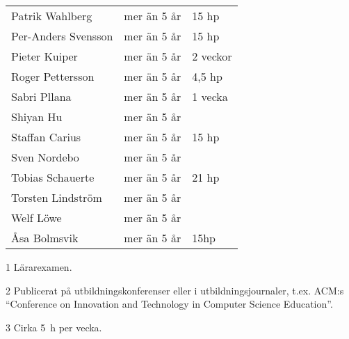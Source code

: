 \begin{threeparttable}
\begin{longtable}[]{@{}lll@{}}
Patrik Wahlberg              & mer än 5 år  & 15 hp         \tabularnewline     
Per-Anders Svensson          & mer än 5 år  & 15 hp         \tabularnewline     
Pieter Kuiper\tnote{2}       & mer än 5 år  & 2 veckor      \tabularnewline     
Roger Pettersson             & mer än 5 år  & 4,5 hp        \tabularnewline     
Sabri Pllana                 & mer än 5 år  & 1 vecka       \tabularnewline     
Shiyan Hu                    & mer än 5 år  &               \tabularnewline     
Staffan Carius               & mer än 5 år  & 15 hp         \tabularnewline     
Sven Nordebo                 & mer än 5 år  &               \tabularnewline     
Tobias Schauerte             & mer än 5 år  & 21 hp         \tabularnewline     
Torsten Lindström\tnote{1}   & mer än 5 år  &               \tabularnewline     
Welf Löwe                    & mer än 5 år  &               \tabularnewline     
Åsa Bolmsvik                 & mer än 5 år  & 15hp          \tabularnewline     
\bottomrule
\end{longtable}
\begin{tablenotes}
\item[1] Lärarexamen.
\item[2] Publicerat på utbildningskonferenser eller i utbildningsjournaler, t.ex. ACM:s ``Conference on Innovation and Technology in Computer Science Education''.
\item[3] Cirka 5~h per vecka.
\end{tablenotes}
\end{threeparttable}